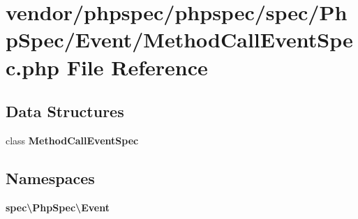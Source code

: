 \section{vendor/phpspec/phpspec/spec/\+Php\+Spec/\+Event/\+Method\+Call\+Event\+Spec.php File Reference}
\label{_method_call_event_spec_8php}
\subsection*{Data Structures}
\begin{DoxyCompactItemize}
\item 
class {\bf Method\+Call\+Event\+Spec}
\end{DoxyCompactItemize}
\subsection*{Namespaces}
\begin{DoxyCompactItemize}
\item 
 {\bf spec\textbackslash{}\+Php\+Spec\textbackslash{}\+Event}
\end{DoxyCompactItemize}
